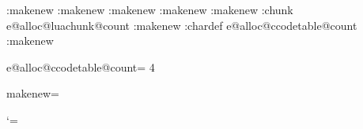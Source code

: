 \def\minim:alloc#1#2#3#4{%
    \global\advance#31%
    \allocationnumber#3%
    \global#2#4\allocationnumber
    \wlog{\string#4=\string#1\the\allocationnumber}%
    \minim:rememberalloc{\csstring#1}{\csstring#4}}

\alloc:makenew \function     {}
\alloc:makenew \attribute    {}
\alloc:makenew \whatsit      {}
\alloc:makenew \luabytecode  {}
\alloc:makenew \luachunkname \chardef:chunk   {e@alloc@luachunk@count}
\alloc:makenew \catcodetable \catcode:chardef {e@alloc@ccodetable@count}
\alloc:makenew \userrule     {}

\def\catcode:chardef#1#2{\chardef#1#2\initcatcodetable#2}
\csname e@alloc@ccodetable@count\endcsname = 4 %

\def\chardef:chunk#1#2{\chardef#1#2\directlua{lua.name[\the#2]='\csstring#1'}}

\protected{}

\def\minim:boxchardef#1{%
    \minim:rememberalloc{box}{\csstring#1}%
    \mathchardef#1}
\edef\newbox{%
    \expandafter\noexpand\csname et@xglob\endcsname
    4\box\noexpand\minim:boxchardef}

\let\alloc:makenew=\undefined



\toksapp{}


\catcode`\:=\minimloaded
\endinput

